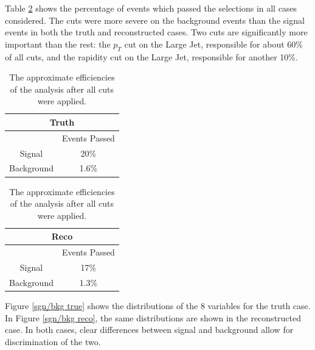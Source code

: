 \documentclass[10pt,a4paper]{book}
\begin{document}
Table \ref{Efficiencies table} shows the percentage of events which passed the selections in all cases considered. The cuts were more severe on the background events than the signal events in both the truth and reconstructed cases. Two cuts are significantly more important than the rest: the $p_T$ cut on the Large Jet, responsible for about 60\% of all cuts, and the rapidity cut on the Large Jet, responsible for another 10\%.

\begin{table}[!htb]
    \begin{minipage}{.5\linewidth}
      \centering
        \begin{tabular}{|c|c|}
		\hline 
		\multicolumn{2}{|c|}{\textbf{Truth}} \\ 
		\hline 
		\* & Events Passed \\ 
		\hline 
		Signal & 20\% \\ 
		\hline 
		Background & 1.6\% \\ 
		\hline 
		\end{tabular}  
    \end{minipage}%
    \begin{minipage}{.5\linewidth}
      \centering
        \begin{tabular}{|c|c|}
		\hline 
		\multicolumn{2}{|c|}{\textbf{Reco}} \\ 
		\hline 
		\* & Events Passed \\ 
		\hline 
		Signal & 17\% \\ 
		\hline 
		Background & 1.3\% \\ 
		\hline 
		\end{tabular} 
    \end{minipage} 
    \caption{The approximate efficiencies of the analysis after all cuts were applied.}
    \label{Efficiencies table}
\end{table}

Figure \ref{sgn/bkg true} shows the distributions of the 8 variables for the truth case. In Figure \ref{sgn/bkg reco}, the same distributions are shown in the reconstructed case. In both cases, clear differences between signal and background allow for discrimination of the two.
\end{document}
